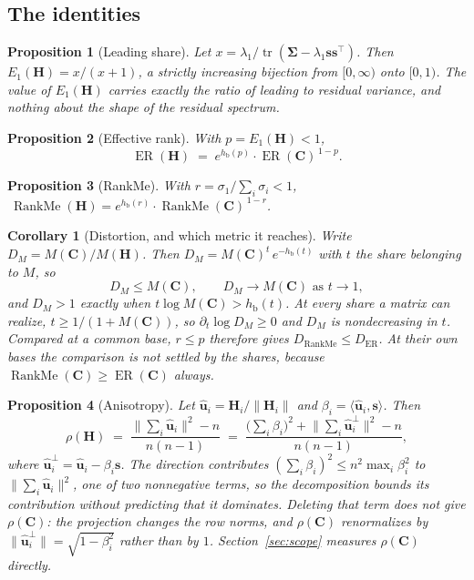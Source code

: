 \documentclass{article}
\theoremstyle{spaced}
\newtheorem{proposition}{Proposition}
\newtheorem{corollary}{Corollary}
\theoremstyle{definition}
\DeclareMathOperator{\ER}{ER}
\DeclareMathOperator{\RankMe}{RankMe}
\DeclareMathOperator{\tr}{tr}
\newcommand{\bH}{\mathbf{H}}
\newcommand{\bC}{\mathbf{C}}
\newcommand{\bs}{\mathbf{s}}
\newcommand{\bu}{\mathbf{u}}
\newcommand{\bSig}{\boldsymbol{\Sigma}}
\newcommand{\hb}{h_{\mathrm{b}}}
\begin{document}
\subsection{The identities}

\begin{proposition}[Leading share]
\label{prop:e1}
Let $x = \lambda_1 / \tr(\bSig - \lambda_1\bs\bs^\top)$. Then $E_1(\bH) = x/(x+1)$, a strictly increasing bijection from $[0,\infty)$ onto $[0,1)$. The value of $E_1(\bH)$ carries exactly the ratio of leading to residual variance, and nothing about the shape of the residual spectrum.
\end{proposition}

\begin{proposition}[Effective rank]
\label{prop:er}
With $p = E_1(\bH) < 1$,
\begin{equation}
\label{eq:er}
\ER(\bH) \;=\; e^{\hb(p)} \cdot \ER(\bC)^{\,1-p} .
\end{equation}
\end{proposition}

\begin{proposition}[RankMe]
\label{prop:rankme}
With $r = \sigma_1/\sum_i \sigma_i < 1$, $\ \RankMe(\bH) = e^{\hb(r)}\cdot\RankMe(\bC)^{\,1-r}$.
\end{proposition}

\begin{corollary}[Distortion, and which metric it reaches]
\label{cor:bound}
Write $D_M = M(\bC)/M(\bH)$. Then $D_M = M(\bC)^{t}\,e^{-\hb(t)}$ with $t$ the share belonging to $M$, so
\begin{equation}
\label{eq:bound}
D_M \le M(\bC), \qquad D_M \to M(\bC) \text{ as } t \to 1 ,
\end{equation}
and $D_M > 1$ exactly when $t\log M(\bC) > \hb(t)$. At every share a matrix can realize, $t \ge 1/(1+M(\bC))$, so $\partial_t \log D_M \ge 0$ and $D_M$ is nondecreasing in $t$. Compared at a common base, $r \le p$ therefore gives $D_{\RankMe} \le D_{\ER}$. At their own bases the comparison is not settled by the shares, because $\RankMe(\bC) \ge \ER(\bC)$ always.
\end{corollary}

\begin{proposition}[Anisotropy]
\label{prop:aniso}
Let $\hat{\bu}_i = \bH_i/\|\bH_i\|$ and $\beta_i = \langle \hat{\bu}_i, \bs\rangle$. Then
\begin{equation}
\label{eq:aniso}
\rho(\bH) \;=\; \frac{\big\|\sum_i \hat{\bu}_i\big\|^2 - n}{n(n-1)}
\;=\; \frac{\big(\sum_i \beta_i\big)^2 + \big\|\sum_i \hat{\bu}_i^{\perp}\big\|^2 - n}{n(n-1)},
\end{equation}
where $\hat{\bu}_i^\perp = \hat{\bu}_i - \beta_i \bs$. The direction contributes $(\sum_i\beta_i)^2 \le n^2\max_i\beta_i^2$ to $\|\sum_i \hat{\bu}_i\|^2$, one of two nonnegative terms, so the decomposition bounds its contribution without predicting that it dominates. Deleting that term does not give $\rho(\bC)$: the projection changes the row norms, and $\rho(\bC)$ renormalizes by $\|\hat{\bu}_i^\perp\| = \sqrt{1-\beta_i^2}$ rather than by $1$. Section~\ref{sec:scope} measures $\rho(\bC)$ directly.
\end{proposition}
\end{document}
